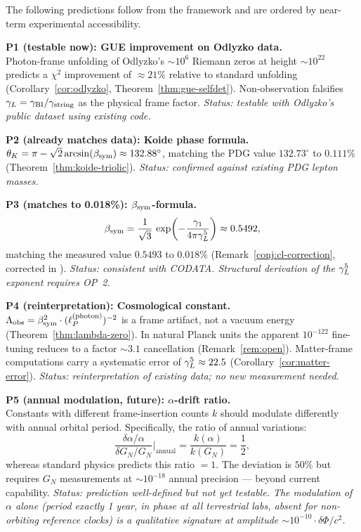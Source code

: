 \begin{corollary}
\label{cor:falsifiable}
The following predictions follow from the framework and are ordered by
near-term experimental accessibility.

\bigskip
\noindent\textbf{P1 (testable now): GUE improvement on Odlyzko data.}\\
Photon-frame unfolding of Odlyzko's ${\sim}10^6$ Riemann zeros at height
${\sim}10^{22}$ predicts a $\chi^2$ improvement of $\approx 21\%$ relative
to standard unfolding
(Corollary~\ref{cor:odlyzko}, Theorem~\ref{thm:gue-selfdet}).
Non-observation falsifies $\gamma_L = \gamma_{\mathrm{BI}}/\gamma_{\mathrm{string}}$ as the physical frame factor.
\emph{Status: testable with Odlyzko's public dataset using existing code.}

\bigskip
\noindent\textbf{P2 (already matches data): Koide phase formula.}\\
$\theta_K = \pi - \sqrt{2}\arcsin(\beta_{\mathrm{sym}}) \approx 132.88^\circ$, matching
the PDG value $132.73^\circ$ to $0.111\%$
(Theorem~\ref{thm:koide-triolic}).
\emph{Status: confirmed against existing PDG lepton masses.}

\bigskip
\noindent\textbf{P3 (matches to 0.018\%): $\beta_{\mathrm{sym}}$-formula.}\\
\[
 \beta_{\mathrm{sym}} = \frac{1}{\sqrt{3}}\,\exp\!\left(-\frac{\gamma_1}{4\pi\gamma_L^5}\right)
 \approx 0.5492,
\]
matching the measured value $0.5493$ to $0.018\%$
(Remark~\ref{conj:cl-correction}, corrected in ).
\emph{Status: consistent with CODATA. Structural derivation of the $\gamma_L^5$
exponent requires OP~2.}

\bigskip
\noindent\textbf{P4 (reinterpretation): Cosmological constant.}\\
$\Lambda_{\mathrm{obs}} = \beta_{\mathrm{sym}}^2 \cdot (\ell_P^{(\mathrm{photon})})^{-2}$
is a frame artifact, not a vacuum energy (Theorem~\ref{thm:lambda-zero}).
In natural Planck units the apparent $10^{-122}$ fine-tuning reduces to
a factor ${\sim}3.1$ cancellation (Remark~\ref{rem:open}).
Matter-frame computations carry a systematic error of $\gamma_L^5 \approx 22.5$
(Corollary~\ref{cor:matter-error}).
\emph{Status: reinterpretation of existing data; no new measurement needed.}

\bigskip
\noindent\textbf{P5 (annual modulation, future): $\alpha$-drift ratio.}\\
Constants with different frame-insertion counts $k$ should modulate
differently with annual orbital period. Specifically, the ratio of
annual variations:
\[
 \frac{\delta\alpha/\alpha}{\delta G_N/G_N}\bigg|_{\mathrm{annual}}
 = \frac{k(\alpha)}{k(G_N)} = \frac12,
\]
whereas standard physics predicts this ratio $= 1$.
The deviation is $50\%$ but requires $G_N$ measurements at
${\sim}10^{-18}$ annual precision --- beyond current capability.
\emph{Status: prediction well-defined but not yet testable. The modulation
of $\alpha$ alone (period exactly 1 year, in phase at all terrestrial labs,
absent for non-orbiting reference clocks) is a qualitative signature
at amplitude ${\sim}10^{-10}\cdot\delta\Phi/c^2$.}


\end{corollary}
